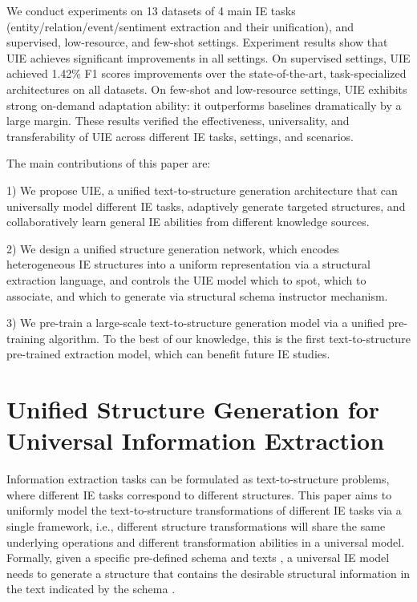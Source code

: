 \documentclass[11pt]{article}
\begin{document}
We conduct experiments on 13 datasets of 4 main IE tasks (entity/relation/event/sentiment extraction and their unification), and supervised, low-resource, and few-shot settings.
Experiment results show that UIE achieves significant improvements in all settings.
On supervised settings, UIE achieved 1.42\% F1 scores improvements over the state-of-the-art, task-specialized architectures on all datasets.
On few-shot and low-resource settings, UIE exhibits strong on-demand adaptation ability: it outperforms baselines dramatically by a large margin.
These results verified the effectiveness,  universality, and transferability of UIE across different IE tasks, settings, and scenarios.

The main contributions of this paper are:

  1) We propose UIE, a unified text-to-structure generation architecture that can universally model different IE tasks, adaptively generate targeted structures, and collaboratively learn general IE abilities from different knowledge sources. 
  
  2) We design a unified structure generation network, which encodes heterogeneous IE structures into a uniform representation via a structural extraction language, and controls the UIE model which to spot, which to associate, and which to generate via structural schema instructor mechanism.
  
  3) We pre-train a large-scale text-to-structure generation model via a unified pre-training algorithm. 
  To the best of our knowledge, this is the first text-to-structure pre-trained extraction model, which can benefit future IE studies.
 
\section{Unified Structure Generation for Universal Information Extraction} \label{sec:unified}

Information extraction tasks can be formulated as text-to-structure problems, where different IE tasks correspond to different structures.
This paper aims to uniformly model the text-to-structure transformations of different IE tasks via a single framework, i.e., different structure transformations will share the same underlying operations and different transformation abilities in a universal model.
Formally, given a specific pre-defined schema  and texts , a universal IE model needs to generate a structure that contains the desirable structural information in the text  indicated by the schema .
\end{document}
